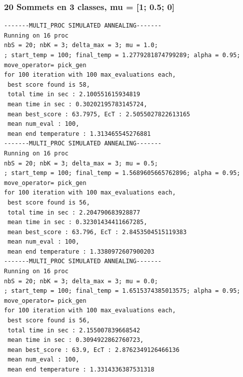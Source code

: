 \documentclass[a4paper]{article}
\begin{document}
\subsubsection{20 Sommets en 3 classes, mu = [1; 0.5; 0]}
\begin{verbatim}
-------MULTI_PROC SIMULATED ANNEALING-------
Running on 16 proc
nbS = 20; nbK = 3; delta_max = 3; mu = 1.0;
; start_temp = 100; final_temp = 1.2779281874799289; alpha = 0.95; move_operator= pick_gen
for 100 iteration with 100 max_evaluations each, 
 best score found is 58,
 total time in sec : 2.100551615934819
 mean time in sec : 0.30202195783145724,
 mean best_score : 63.7975, EcT : 2.5055027822613165
 mean num_eval : 100,
 mean end temperature : 1.313465545276881
-------MULTI_PROC SIMULATED ANNEALING-------
Running on 16 proc
nbS = 20; nbK = 3; delta_max = 3; mu = 0.5;
; start_temp = 100; final_temp = 1.5689605665762896; alpha = 0.95; move_operator= pick_gen
for 100 iteration with 100 max_evaluations each, 
 best score found is 56,
 total time in sec : 2.204790683928877
 mean time in sec : 0.32301434411667285,
 mean best_score : 63.796, EcT : 2.8453504515119383
 mean num_eval : 100,
 mean end temperature : 1.3380972607900203
-------MULTI_PROC SIMULATED ANNEALING-------
Running on 16 proc
nbS = 20; nbK = 3; delta_max = 3; mu = 0.0;
; start_temp = 100; final_temp = 1.6515374385013575; alpha = 0.95; move_operator= pick_gen
for 100 iteration with 100 max_evaluations each, 
 best score found is 56,
 total time in sec : 2.155007839668542
 mean time in sec : 0.3094922862760723,
 mean best_score : 63.9, EcT : 2.8762349126466136
 mean num_eval : 100,
 mean end temperature : 1.3314336387531318
\end{verbatim}
\end{document}
